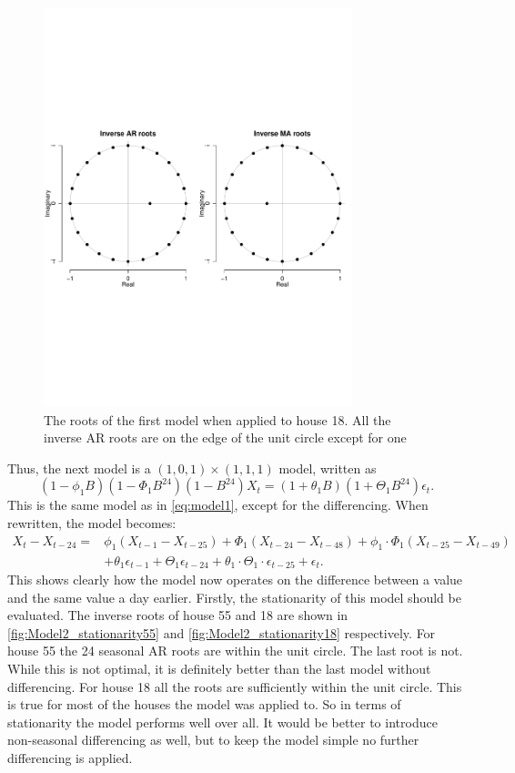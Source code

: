 \begin{figure}
    \centering
    \includegraphics[width=0.8\textwidth]{../../../figures/arimax/Stationarity_model1_18.pdf}
    \caption{The roots of the first model when applied to house 18. All the inverse AR roots are on the edge of the unit circle except for one}
    \label{fig:Model1_stationarity18}
\end{figure}


\noindent Thus, the next model is a $(1,0,1)\times(1,1,1)$ model, written as
\begin{equation}
    (1-\phi_1 B)(1-\Phi_1 B^{24})(1-B^{24})X_t = (1+\theta_1 B)(1+\Theta_1 B^{24}) \epsilon_t.
\end{equation}
This is the same model as in \cref{eq:model1}, except for the differencing. When rewritten, the model becomes:
\begin{align}
    X_t-X_{t-24} = &\phi_1 (X_{t-1}-X_{t-25}) + \Phi_1 (X_{t-24}-X_{t-48}) + \phi_1 \cdot \Phi_1  (X_{t-25}-X_{t-49})\nonumber  \\  &+ \theta_1 \epsilon_{t-1} + \Theta_1 \epsilon_{t-24} + \theta_1 \cdot \Theta_1 \cdot \epsilon_{t-25} + \epsilon_t. \label{model101111}
\end{align}
This shows clearly how the model now operates on the difference between a value and the same value a day earlier. Firstly, the stationarity of this model should be evaluated. The inverse roots of house 55 and 18 are shown in \cref{fig:Model2_stationarity55} and \cref{fig:Model2_stationarity18} respectively. For house 55 the 24 seasonal AR roots are within the unit circle. The last root is not. While this is not optimal, it is definitely better than the last model without differencing. For house 18 all the roots are sufficiently within the unit circle. This is true for most of the houses the model was applied to. So in terms of stationarity the model performs well over all. It would be better to introduce non-seasonal differencing as well, but to keep the model simple no further differencing is applied.


